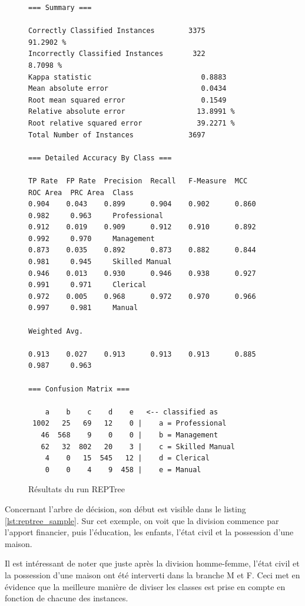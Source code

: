 \begin{figure}[H]
\centering
\begin{lstlisting}
=== Summary ===

Correctly Classified Instances        3375               91.2902 %
Incorrectly Classified Instances       322                8.7098 %
Kappa statistic                          0.8883
Mean absolute error                      0.0434
Root mean squared error                  0.1549
Relative absolute error                 13.8991 %
Root relative squared error             39.2271 %
Total Number of Instances             3697

=== Detailed Accuracy By Class ===

TP Rate  FP Rate  Precision  Recall   F-Measure  MCC      ROC Area  PRC Area  Class
0.904    0.043    0.899      0.904    0.902      0.860    0.982     0.963     Professional
0.912    0.019    0.909      0.912    0.910      0.892    0.992     0.970     Management
0.873    0.035    0.892      0.873    0.882      0.844    0.981     0.945     Skilled Manual
0.946    0.013    0.930      0.946    0.938      0.927    0.991     0.971     Clerical
0.972    0.005    0.968      0.972    0.970      0.966    0.997     0.981     Manual

Weighted Avg.

0.913    0.027    0.913      0.913    0.913      0.885    0.987     0.963

=== Confusion Matrix ===

    a    b    c    d    e   <-- classified as
 1002   25   69   12    0 |    a = Professional
   46  568    9    0    0 |    b = Management
   62   32  802   20    3 |    c = Skilled Manual
    4    0   15  545   12 |    d = Clerical
    0    0    4    9  458 |    e = Manual
\end{lstlisting}
\caption{Résultats du run REPTree}
\label{lst:reptree_res}
\end{figure}

Concernant l'arbre de décision, son début est visible dans le listing \autoref{lst:reptree_sample}. Sur cet exemple, on voit que la division commence par l'apport financier, puis l'éducation, les enfants, l'état civil et la possession d'une maison.

Il est intéressant de noter que juste après la division homme-femme, l'état civil et la possession d'une maison ont été interverti dans la branche M et F. Ceci met en évidence que la meilleure manière de diviser les classes est prise en compte en fonction de chacune des instances.

